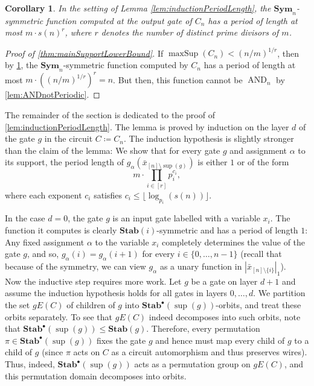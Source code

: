\documentclass[11pt]{article}
\DeclareMathOperator{\supp}{sup}
\DeclareMathOperator{\AND}{AND}
\DeclareMathOperator{\maxSup}{maxSup}
\newcommand{\Sym}{\mathbf{Sym}}
\newcommand{\Stab}{\mathbf{Stab}}
\newcommand{\StabP}{\mathbf{Stab}^{\bullet}}
\theoremstyle{definition}
\theoremstyle{plain}
\newtheorem{corollary}[definition]{Corollary}
\theoremstyle{remark}
\theoremstyle{remark}
\begin{document}
\begin{corollary}
\label{cor:upperboundPeriodLength}
In the setting of Lemma \ref{lem:inductionPeriodLength}, the $\Sym_n$-symmetric function computed at the output gate of $C_n$ has a period of length at most $m \cdot s(n)^r$, where $r$ denotes the number of distinct prime divisors of $m$.
\end{corollary}


\begin{proof}[Proof of \cref{thm:mainSupportLowerBound}]
	If $\maxSup(C_n) < (n/m)^{1/r}$, then by \cref{cor:upperboundPeriodLength}, the $\Sym_n$-symmetric function computed by $C_n$ has a period of length at most $m \cdot ( (n/m)^{1/r})^r = n$. But then, this function cannot be $\AND_n$ by \cref{lem:ANDnotPeriodic}.
\end{proof}	

The remainder of the section is dedicated to the proof of \cref{lem:inductionPeriodLength}.
The lemma is proved by induction on the layer $d$ of the gate $g$ in the circuit $C \coloneqq C_n$. The induction hypothesis is slightly stronger than the claim of the lemma: We show that for every gate $g$ and assignment $\alpha$ to its support, the period length of $g_\alpha(\bar{x}_{[n] \setminus \supp(g)})$ is either $1$ or of the form 
\[
m \cdot \prod_{i \in [r]} p_i^{c_i},
\]
where each exponent $c_i$ satisfies $c_i \leq \lfloor \log_{p_i}(s(n)) \rfloor$.

In the case $d=0$, the gate $g$ is an input gate labelled with a variable $x_i$. The function it computes is clearly $\Stab(i)$-symmetric and has a period of length $1$: Any fixed assignment $\alpha$ to the variable $x_i$ completely determines the value of the gate $g$, and so, $g_\alpha(i)=g_\alpha(i+1)$ for every $i \in \{0, \dots, n-1\}$ (recall that because of the symmetry, we can view $g_\alpha$ as a unary function in $|\bar{x}_{[n] \setminus \{i\}}|_1$).\\ 

Now the inductive step requires more work. Let $g$ be a gate on layer $d+1$ and assume the induction hypothesis holds for all gates in layers $0, \dots, d$. We partition the set $gE(C)$ of children of $g$ into $\StabP(\supp(g))$-orbits, and treat these orbits separately. 
To see that $gE(C)$ indeed decomposes into such orbits, note that $\StabP(\supp(g)) \leq \Stab(g)$. Therefore, every permutation $\pi \in \StabP(\supp(g))$ fixes the gate $g$ and hence must map every child of $g$ to a child of $g$ (since $\pi$ acts on $C$ as a circuit automorphism and thus preserves wires). Thus, indeed, $\StabP(\supp(g))$ acts as a permutation group on $gE(C)$, and this permutation domain decomposes into orbits.
\end{document}
